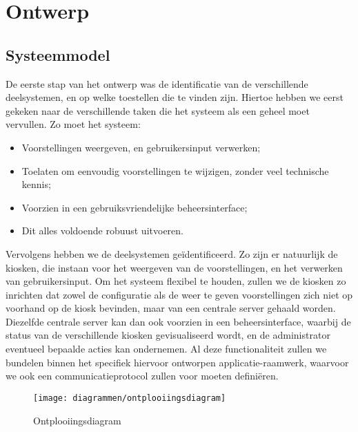 \part{Ontwerp}
\label{ontwerp}

%
%

\chapter{Systeemmodel}
\label{ontwerp:systeemmodel}

De eerste stap van het ontwerp was de identificatie van de verschillende deelsystemen, en op welke toestellen die te vinden zijn. Hiertoe hebben we eerst gekeken naar de verschillende taken die het systeem als een geheel moet vervullen. Zo moet het systeem:
\begin{itemize}
\item Voorstellingen weergeven, en gebruikersinput verwerken;
\item Toelaten om eenvoudig voorstellingen te wijzigen, zonder veel technische kennis;
\item Voorzien in een gebruiksvriendelijke beheersinterface;
\item Dit alles voldoende robuust uitvoeren.
\end{itemize}

Vervolgens hebben we de deelsystemen geïdentificeerd. Zo zijn er natuurlijk de kiosken, die instaan voor het weergeven van de voorstellingen, en het verwerken van gebruikersinput. Om het systeem flexibel te houden, zullen we de kiosken zo inrichten dat zowel de configuratie als de weer te geven voorstellingen zich niet op voorhand op de kiosk bevinden, maar van een centrale server gehaald worden. Diezelfde centrale server kan dan ook voorzien in een beheersinterface, waarbij de status van de verschillende kiosken gevisualiseerd wordt, en de administrator eventueel bepaalde acties kan ondernemen. Al deze functionaliteit zullen we bundelen binnen het specifiek hiervoor ontworpen applicatie-raamwerk, waarvoor we ook een communicatieprotocol zullen voor moeten definiëren.


\begin{figure}
	\texttt{[image: diagrammen/ontplooiingsdiagram]}
	\caption{Ontplooiingsdiagram}
\end{figure}

